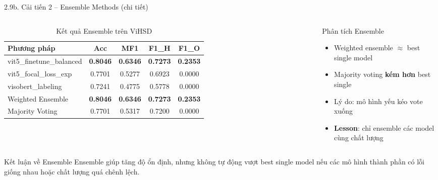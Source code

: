\documentclass[11pt, aspectratio=169]{beamer}
\begin{document}
\begin{frame}[shrink=8]{2.9b. Cải tiến 2 -- Ensemble Methods (chi tiết)}

\begin{columns}[T]
  \begin{table}[h]
    \centering
    \caption{Kết quả Ensemble trên ViHSD}
    \vspace{0.1cm}
    \scriptsize
    \begin{tabular}{lcccc}
      \toprule
      \textbf{Phương pháp} & \textbf{Acc} & \textbf{MF1} & \textbf{F1\_H} & \textbf{F1\_O} \\
      \midrule
      vit5\_finetune\_balanced & \textbf{0.8046} & \textbf{0.6346} & \textbf{0.7273} & \textbf{0.2353} \\
      vit5\_focal\_loss\_exp & 0.7701 & 0.5277 & 0.6923 & 0.0000 \\
      visobert\_labeling & 0.7241 & 0.4775 & 0.5778 & 0.0000 \\
      \midrule
      Weighted Ensemble & \textbf{0.8046} & \textbf{0.6346} & \textbf{0.7273} & \textbf{0.2353} \\
      Majority Voting & 0.7701 & 0.5317 & 0.7200 & 0.0000 \\
      \bottomrule
    \end{tabular}
  \end{table}

  \begin{block}{Phân tích Ensemble}
    \begin{itemize}
      \item Weighted ensemble $\approx$ best single model
      \item Majority voting \textbf{kém hơn} best single
      \item Lý do: mô hình yếu kéo vote xuống
      \item \textbf{Lesson}: chỉ ensemble các model cùng chất lượng
    \end{itemize}
  \end{block}
\end{columns}

\vspace{0.2cm}
\begin{block}{Kết luận về Ensemble}
  Ensemble giúp tăng độ ổn định, nhưng không tự động vượt best single model nếu các mô hình thành phần có lỗi giống nhau hoặc chất lượng quá chênh lệch.
\end{block}
\end{frame}
\end{document}
